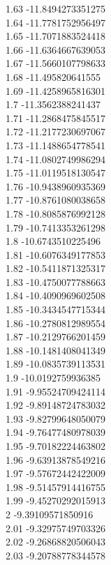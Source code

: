 {1.63	-11.8494273351275\\
1.64	-11.7781752956497\\
1.65	-11.7071883524418\\
1.66	-11.6364667639053\\
1.67	-11.5660107798633\\
1.68	-11.495820641555\\
1.69	-11.4258965816301\\
1.7	-11.3562388241437\\
1.71	-11.2868475845517\\
1.72	-11.2177230697067\\
1.73	-11.1488654778541\\
1.74	-11.0802749986294\\
1.75	-11.0119518130547\\
1.76	-10.9438960935369\\
1.77	-10.8761080038658\\
1.78	-10.8085876992128\\
1.79	-10.7413353261298\\
1.8	-10.6743510225496\\
1.81	-10.6076349177853\\
1.82	-10.5411871325317\\
1.83	-10.4750077788663\\
1.84	-10.4090969602508\\
1.85	-10.3434547715344\\
1.86	-10.2780812989554\\
1.87	-10.2129766201459\\
1.88	-10.1481408041349\\
1.89	-10.0835739113531\\
1.9	-10.0192759936385\\
1.91	-9.95524709424114\\
1.92	-9.89148724783032\\
1.93	-9.82799648050079\\
1.94	-9.76477480978039\\
1.95	-9.70182224463802\\
1.96	-9.63913878549216\\
1.97	-9.57672442422009\\
1.98	-9.51457914416755\\
1.99	-9.45270292015913\\
2	-9.39109571850916\\
2.01	-9.32975749703326\\
2.02	-9.26868820506043\\
2.03	-9.20788778344578\\
}
